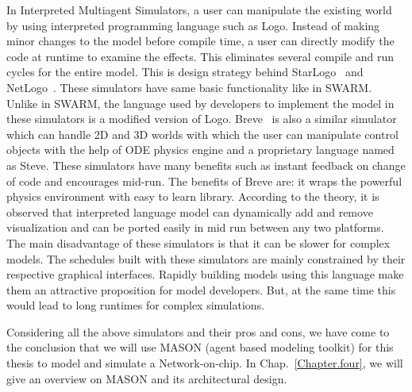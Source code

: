 In Interpreted Multiagent Simulators, a user can manipulate the existing world by using interpreted programming language such as Logo. Instead of making minor changes to the model before compile time, a user can directly modify the code at runtime to examine the effects. This eliminates several compile and run cycles for the entire model. This is design strategy behind StarLogo~\cite{Mitchel, StarLogo} and NetLogo~\cite{Uri}. These simulators have same basic functionality like in SWARM. Unlike in SWARM, the language used by developers to implement the model in these simulators is a modified version of Logo. Breve~\cite{Jon, Breve} is also a similar simulator which can handle 2D and 3D worlds with which the user can manipulate control objects with the help of ODE physics engine and a proprietary language named as Steve. These simulators have many benefits such as instant feedback on change of code and encourages mid-run. The benefits of Breve are: it wraps the powerful physics 
environment with easy to learn library. According to the theory, it is observed that interpreted language model can dynamically add and remove visualization and can be ported easily in mid run between any two platforms. The main disadvantage of these simulators is that it can be slower for complex models. The schedules built with these simulators are mainly constrained by their respective graphical interfaces. Rapidly building models using this language make them an attractive proposition for model developers. But, at the same time this would lead to long runtimes for complex simulations. 

Considering all the above simulators and their pros and cons, we have come to the conclusion that we will use MASON (agent based modeling toolkit) for this thesis to model and simulate a Network-on-chip. In Chap.~\ref{Chapter.four}, we will give an overview on MASON and its architectural design. 
